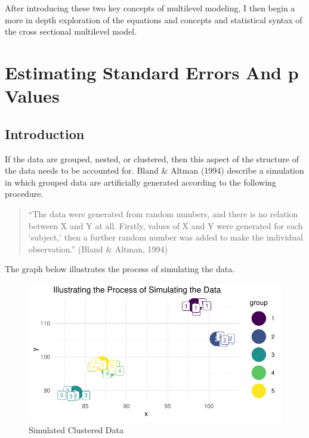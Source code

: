 \documentclass[
  letterpaper,
  DIV=11,
  numbers=noendperiod]{scrreprt}
\begin{document}
After introducing these two key concepts of multilevel modeling, I then
begin a more in depth exploration of the equations and concepts and
statistical syntax of the cross sectional multilevel model.

\hypertarget{sec-pvalues}{%
\section{Estimating Standard Errors And p Values}\label{sec-pvalues}}

\hypertarget{introduction-1}{%
\subsection{Introduction}\label{introduction-1}}

If the data are grouped, nested, or clustered, then this aspect of the
structure of the data needs to be accounted for. Bland \& Altman (1994)
describe a simulation in which grouped data are artificially generated
according to the following procedure.

\begin{quote}
``The data were generated from random numbers, and there is no relation
between X and Y at all. Firstly, values of X and Y were generated for
each `subject,' then a further random number was added to make the
individual observation.'' (Bland \& Altman, 1994)
\end{quote}

The graph below illustrates the process of simulating the data.

\begin{figure}

{\centering \includegraphics{cross-sectional_files/figure-pdf/fig-simulatedclustereddata-1.pdf}

}

\caption{\label{fig-simulatedclustereddata}Simulated Clustered Data}

\end{figure}
\end{document}
